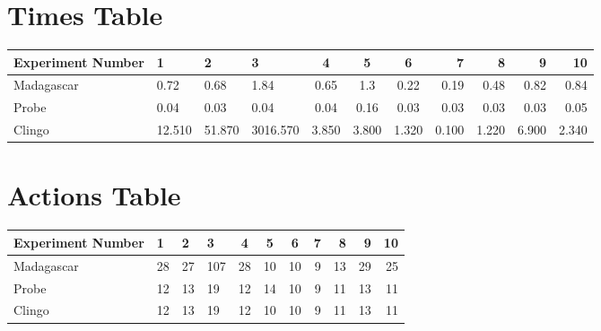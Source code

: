 \documentclass[8pt]{article}
\begin{document}
\begin{landscape}
\section{Times Table}\begin{tabular}{ | l | l | l | l | c | c | c | r | r | r | r | }\hline
Experiment Number & 1 & 2 & 3 & 4 & 5 & 6 & 7 & 8 & 9 & 10\\  \hline
Madagascar & 0.72 & 0.68 & 1.84 & 0.65 & 1.3 & 0.22 & 0.19 & 0.48 & 0.82 & 0.84\\  \hline
Probe & 0.04 & 0.03 & 0.04 & 0.04 & 0.16 & 0.03 & 0.03 & 0.03 & 0.03 & 0.05\\  \hline
Clingo & 12.510 & 51.870 & 3016.570 & 3.850 & 3.800 & 1.320 & 0.100 & 1.220 & 6.900 & 2.340\\  \hline
\end{tabular}
\section{Actions Table}\begin{tabular}{ | l | l | l | l | c | c | c | r | r | r | r | }\hline
Experiment Number & 1 & 2 & 3 & 4 & 5 & 6 & 7 & 8 & 9 & 10\\ \hline
 Madagascar & 28 & 27 & 107 & 28 & 10 & 10 & 9 & 13 & 29 & 25\\ \hline
 Probe & 12 & 13 & 19 & 12 & 14 & 10 & 9 & 11 & 13 & 11\\ \hline
 Clingo & 12 & 13 & 19 & 12 & 10 & 10 & 9 & 11 & 13 & 11\\ \hline
\end{tabular}
\end{landscape}
\end{document}
